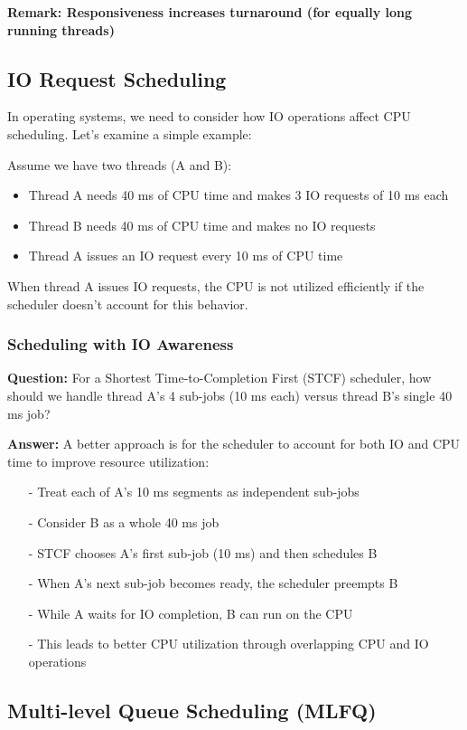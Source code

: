 \documentclass[../../compsys.tex]{subfiles}
\begin{document}
\textbf{Remark: Responsiveness increases turnaround (for equally long running threads)}
\subsection{IO Request Scheduling}
In operating systems, we need to consider how IO operations affect CPU scheduling. Let's examine a simple example:

Assume we have two threads (A and B):
\begin{itemize}
    \item Thread A needs 40 ms of CPU time and makes 3 IO requests of 10 ms each
    \item Thread B needs 40 ms of CPU time and makes no IO requests
    \item Thread A issues an IO request every 10 ms of CPU time
\end{itemize}

When thread A issues IO requests, the CPU is not utilized efficiently if the scheduler doesn't account for this behavior.

\subsubsection{Scheduling with IO Awareness}
\textbf{Question: } For a Shortest Time-to-Completion First (STCF) scheduler, how should we handle thread A's 4 sub-jobs (10 ms each) versus thread B's single 40 ms job?

\textbf{Answer: } A better approach is for the scheduler to account for both IO and CPU time to improve resource utilization:
\begin{itemize}
    \item[-] Treat each of A's 10 ms segments as independent sub-jobs
    \item[-] Consider B as a whole 40 ms job
    \item[-] STCF chooses A's first sub-job (10 ms) and then schedules B
    \item[-] When A's next sub-job becomes ready, the scheduler preempts B
    \item[-] While A waits for IO completion, B can run on the CPU
    \item[-] This leads to better CPU utilization through overlapping CPU and IO operations
\end{itemize}

\subsection{Multi-level Queue Scheduling (MLFQ)}
\end{document}
